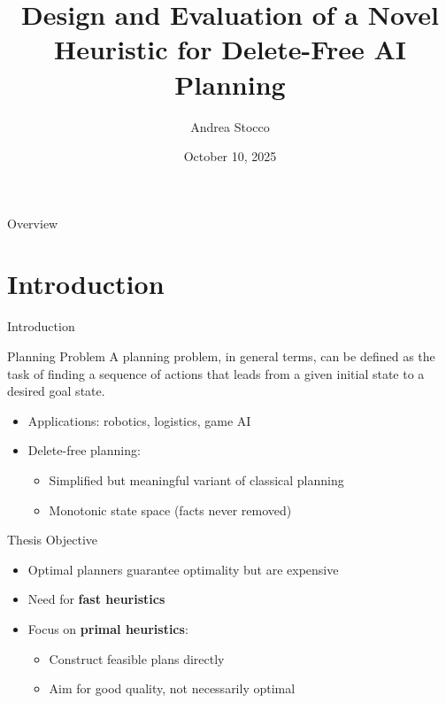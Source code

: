 \documentclass[aspectratio=169,xcolor=dvipsnames]{beamer}
\title{Design and Evaluation of a Novel Heuristic for Delete-Free AI Planning}
\author{Andrea Stocco}
\institute
{
    Department of Information Engineering \\
    University of Padova %
}
\date{October 10, 2025} %
\begin{document}
\begin{frame}
	\titlepage
\end{frame}

\begin{frame}{Overview}
	\tableofcontents
\end{frame}

\section{Introduction}

\begin{frame}{Introduction}
	\begin{block}{Planning Problem}
		A planning problem, in general terms, can be defined as the task of finding a sequence
		of actions that leads from a given initial state to a desired goal state.
	\end{block}
	\begin{itemize}
		\item Applications: robotics, logistics, game AI
		\item Delete-free planning:
		      \begin{itemize}
			      \item Simplified but meaningful variant of classical planning
			      \item Monotonic state space (facts never removed)
		      \end{itemize}
	\end{itemize}
\end{frame}

\begin{frame}{Thesis Objective}
	\begin{itemize}
		\item Optimal planners guarantee optimality but are expensive
		\item Need for \textbf{fast heuristics}
		\item Focus on \textbf{primal heuristics}:
		      \begin{itemize}
			      \item Construct feasible plans directly
			      \item Aim for good quality, not necessarily optimal
		      \end{itemize}
	\end{itemize}
\end{frame}
\end{document}
